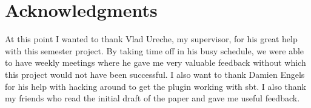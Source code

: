  \section{Acknowledgments}
%
 At this point I wanted to thank Vlad Ureche, my supervisor, for his great help with this semester project. By taking time off in his busy schedule, we were able to have weekly meetings where he gave me very valuable feedback without which this project would not have been successful. I also want to thank Damien Engels for his help with hacking around to get the plugin working with sbt. I also thank my friends who read the initial draft of the paper and gave me useful feedback.